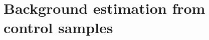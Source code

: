 \section{Background estimation from control samples\label{app:bk-yields}}
\begin{landscape}






\end{landscape}
